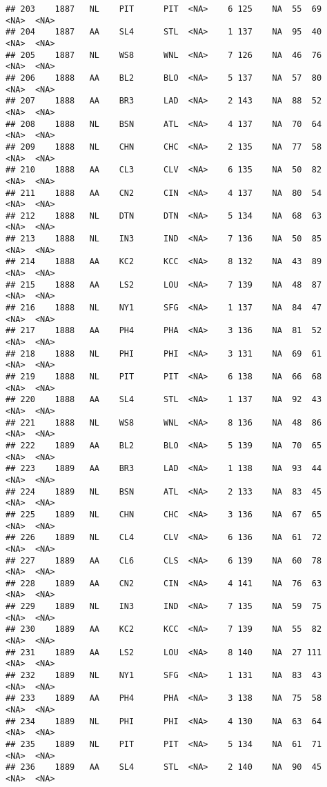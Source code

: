 \documentclass[]{article}
\begin{document}
\begin{verbatim}
## 203    1887   NL    PIT      PIT  <NA>    6 125    NA  55  69   <NA>  <NA>
## 204    1887   AA    SL4      STL  <NA>    1 137    NA  95  40   <NA>  <NA>
## 205    1887   NL    WS8      WNL  <NA>    7 126    NA  46  76   <NA>  <NA>
## 206    1888   AA    BL2      BLO  <NA>    5 137    NA  57  80   <NA>  <NA>
## 207    1888   AA    BR3      LAD  <NA>    2 143    NA  88  52   <NA>  <NA>
## 208    1888   NL    BSN      ATL  <NA>    4 137    NA  70  64   <NA>  <NA>
## 209    1888   NL    CHN      CHC  <NA>    2 135    NA  77  58   <NA>  <NA>
## 210    1888   AA    CL3      CLV  <NA>    6 135    NA  50  82   <NA>  <NA>
## 211    1888   AA    CN2      CIN  <NA>    4 137    NA  80  54   <NA>  <NA>
## 212    1888   NL    DTN      DTN  <NA>    5 134    NA  68  63   <NA>  <NA>
## 213    1888   NL    IN3      IND  <NA>    7 136    NA  50  85   <NA>  <NA>
## 214    1888   AA    KC2      KCC  <NA>    8 132    NA  43  89   <NA>  <NA>
## 215    1888   AA    LS2      LOU  <NA>    7 139    NA  48  87   <NA>  <NA>
## 216    1888   NL    NY1      SFG  <NA>    1 137    NA  84  47   <NA>  <NA>
## 217    1888   AA    PH4      PHA  <NA>    3 136    NA  81  52   <NA>  <NA>
## 218    1888   NL    PHI      PHI  <NA>    3 131    NA  69  61   <NA>  <NA>
## 219    1888   NL    PIT      PIT  <NA>    6 138    NA  66  68   <NA>  <NA>
## 220    1888   AA    SL4      STL  <NA>    1 137    NA  92  43   <NA>  <NA>
## 221    1888   NL    WS8      WNL  <NA>    8 136    NA  48  86   <NA>  <NA>
## 222    1889   AA    BL2      BLO  <NA>    5 139    NA  70  65   <NA>  <NA>
## 223    1889   AA    BR3      LAD  <NA>    1 138    NA  93  44   <NA>  <NA>
## 224    1889   NL    BSN      ATL  <NA>    2 133    NA  83  45   <NA>  <NA>
## 225    1889   NL    CHN      CHC  <NA>    3 136    NA  67  65   <NA>  <NA>
## 226    1889   NL    CL4      CLV  <NA>    6 136    NA  61  72   <NA>  <NA>
## 227    1889   AA    CL6      CLS  <NA>    6 139    NA  60  78   <NA>  <NA>
## 228    1889   AA    CN2      CIN  <NA>    4 141    NA  76  63   <NA>  <NA>
## 229    1889   NL    IN3      IND  <NA>    7 135    NA  59  75   <NA>  <NA>
## 230    1889   AA    KC2      KCC  <NA>    7 139    NA  55  82   <NA>  <NA>
## 231    1889   AA    LS2      LOU  <NA>    8 140    NA  27 111   <NA>  <NA>
## 232    1889   NL    NY1      SFG  <NA>    1 131    NA  83  43   <NA>  <NA>
## 233    1889   AA    PH4      PHA  <NA>    3 138    NA  75  58   <NA>  <NA>
## 234    1889   NL    PHI      PHI  <NA>    4 130    NA  63  64   <NA>  <NA>
## 235    1889   NL    PIT      PIT  <NA>    5 134    NA  61  71   <NA>  <NA>
## 236    1889   AA    SL4      STL  <NA>    2 140    NA  90  45   <NA>  <NA>

\end{verbatim}
\end{document}

